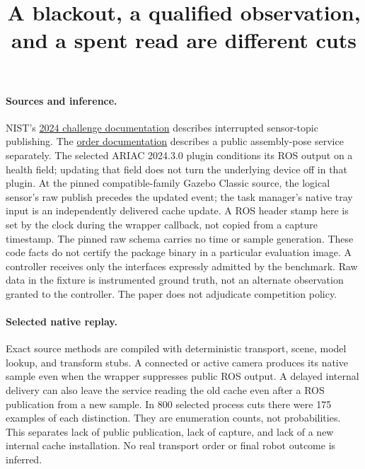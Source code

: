 \documentclass{article}
\begin{document}
\title{A blackout, a qualified observation, and a spent read are different cuts}
\maketitle

\paragraph{Sources and inference.}
NIST's \href{https://pages.nist.gov/ARIAC_docs/en/2024.1.0/competition/challenges.html}{2024 challenge documentation}
describes interrupted sensor-topic publishing. The
\href{https://pages.nist.gov/ARIAC_docs/en/2024.1.0/competition/orders.html}{order documentation}
describes a public assembly-pose service separately.
The selected ARIAC 2024.3.0 plugin conditions its ROS output on a
health field; updating that field does not turn the underlying device
off in that plugin. At the pinned compatible-family Gazebo Classic
source, the logical sensor's raw publish precedes the updated event;
the task manager's native tray input is an independently delivered
cache update. A ROS header stamp here is set by the clock during the
wrapper callback, not copied from a capture timestamp. The pinned
raw schema carries no time or sample generation. These code facts do
not certify the package binary in a particular evaluation image.
A controller receives only the interfaces expressly admitted by the
benchmark. Raw data in the fixture is instrumented ground truth,
not an alternate observation granted to the controller. The paper
does not adjudicate competition policy.

\paragraph{Selected native replay.}
Exact source methods are compiled with deterministic transport,
scene, model lookup, and transform stubs. A connected or active
camera produces its native sample even when the wrapper suppresses
public ROS output. A delayed internal delivery can also leave the
service reading the old cache even after a ROS publication from a new
sample. In 800 selected process cuts there were 175 examples of
each distinction. They are enumeration counts, not probabilities.
This separates lack of public publication, lack of capture, and
lack of a new internal cache installation. No real transport
order or final robot outcome is inferred.
\end{document}
